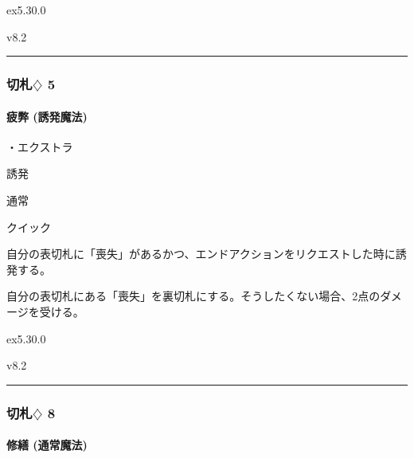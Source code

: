 \documentclass[letterpaper,10pt,dvipdfmx]{sphinxmanual}
\begin{document}
\sphinxAtStartPar
{}  ex5.30.0

\sphinxAtStartPar
{}  v8.2


\bigskip\hrule\bigskip



\subsubsection{切札{\normalsize $\diamondsuit$} 5}
\label{\detokenize{auto/frameActionlist:id57}}

\paragraph{疲弊 (誘発魔法)}
\label{\detokenize{auto/frameActionlist:act-exhaust}}\label{\detokenize{auto/frameActionlist:id58}}
\sphinxAtStartPar
{}

\sphinxAtStartPar
・エクストラ

\sphinxAtStartPar
{} 誘発

\sphinxAtStartPar
{} 通常

\sphinxAtStartPar
{} クイック

\sphinxAtStartPar
{}

\sphinxAtStartPar
自分の表切札に「喪失」があるかつ、エンドアクションをリクエストした時に誘発する。

\sphinxAtStartPar
{}

\sphinxAtStartPar
自分の表切札にある「喪失」を裏切札にする。そうしたくない場合、2点のダメージを受ける。

\sphinxAtStartPar
{}  ex5.30.0

\sphinxAtStartPar
{}  v8.2


\bigskip\hrule\bigskip



\subsubsection{切札{\normalsize $\diamondsuit$} 8}
\label{\detokenize{auto/frameActionlist:id59}}

\paragraph{修繕 (通常魔法)}
\label{\detokenize{auto/frameActionlist:act-repair}}\label{\detokenize{auto/frameActionlist:id60}}
\sphinxAtStartPar
{}
\end{document}
